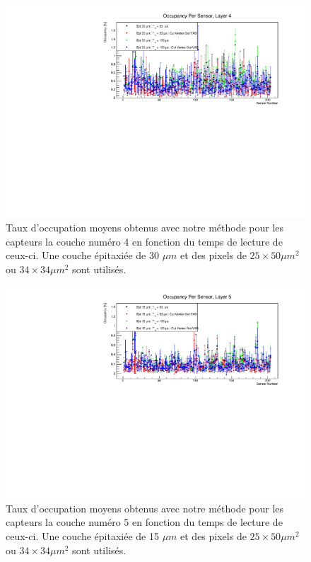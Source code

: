 \begin{appendices}
   \begin{figure}[!htb]
    \begin{center}
      \includegraphics[scale=0.80]{./figures/sensors_Readout_Time/resultOccupancyPerSensor/occupancyPerSensor_Layer4_epi30um.pdf}
      \caption{Taux d'occupation moyens obtenus avec notre m\'ethode pour les capteurs la couche num\'ero 4 en fonction du temps de lecture de ceux-ci. Une couche \'epitaxi\'ee de 30 $\mu m$ et des pixels de $25 \times 50 \mu m^2$ ou $34 \times 34 \mu m^2$ sont utilis\'es.}
      \label{fig:OccupancyLayer4_epi30um}
    \end{center}
  \end{figure}  

   \begin{figure}[!htb]
    \begin{center}
      \includegraphics[scale=0.80]{./figures/sensors_Readout_Time/resultOccupancyPerSensor/occupancyPerSensor_Layer5_epi15um.pdf}
      \caption{Taux d'occupation moyens obtenus avec notre m\'ethode pour les capteurs la couche num\'ero 5 en fonction du temps de lecture de ceux-ci. Une couche \'epitaxi\'ee de 15 $\mu m$ et des pixels de $25 \times 50 \mu m^2$ ou $34 \times 34 \mu m^2$ sont utilis\'es.}
      \label{fig:OccupancyLayer5_epi15um}
    \end{center}
  \end{figure}


\end{appendices}
